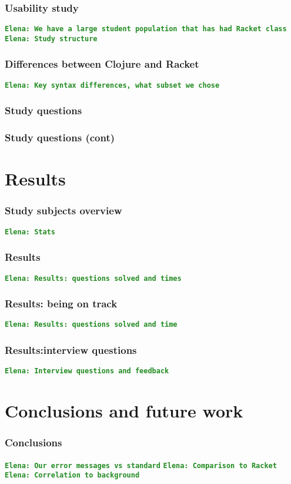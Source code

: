 \documentclass{beamer}
\newcommand{\comment}[1]{{\bf \tt  {#1}}}
\newcommand{\emcomment}[1]{\textcolor{ForestGreen}{\comment{Elena: {#1}}}}
\begin{document}
\begin{frame}
\frametitle{Usability study}
\emcomment{We have a large student population that has had Racket class}
\emcomment{Study structure}
\end{frame}

\begin{frame}
\frametitle{ Differences between Clojure and Racket}
\emcomment{Key syntax differences, what subset we chose}
\end{frame}

\begin{frame}
\frametitle{Study questions}

\end{frame}

\begin{frame}
\frametitle{Study questions (cont)}

\end{frame}

\section{Results}

\begin{frame}
\frametitle{Study subjects overview}
\emcomment{Stats}
\end{frame}

\begin{frame}
\frametitle{Results}
\emcomment{Results: questions solved and times}
\end{frame}

\begin{frame}
\frametitle{Results: being on track}
\emcomment{Results: questions solved and time}
\end{frame}

\begin{frame}
\frametitle{Results:interview questions}
\emcomment{Interview questions and feedback}
\end{frame}

\section{Conclusions and future work}

\frametitle{Conclusions}
\begin{frame}
\emcomment{Our error messages vs standard}
\emcomment{Comparison to Racket}
\emcomment{Correlation to background}
\end{frame}
\end{document}
